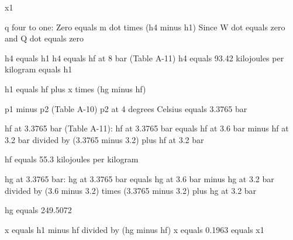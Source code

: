 x1  

q four to one:  
Zero equals m dot times (h4 minus h1)  
Since W dot equals zero and Q dot equals zero  

h4 equals h1  
h4 equals hf at 8 bar (Table A-11)  
h4 equals 93.42 kilojoules per kilogram equals h1  

h1 equals hf plus x times (hg minus hf)  

p1 minus p2 (Table A-10)  
p2 at 4 degrees Celsius equals 3.3765 bar  

hf at 3.3765 bar (Table A-11):  
hf at 3.3765 bar equals hf at 3.6 bar minus hf at 3.2 bar divided by (3.3765 minus 3.2) plus hf at 3.2 bar  

hf equals 55.3 kilojoules per kilogram  

hg at 3.3765 bar:  
hg at 3.3765 bar equals hg at 3.6 bar minus hg at 3.2 bar divided by (3.6 minus 3.2) times (3.3765 minus 3.2) plus hg at 3.2 bar  

hg equals 249.5072  

x equals h1 minus hf divided by (hg minus hf)  
x equals 0.1963 equals x1
